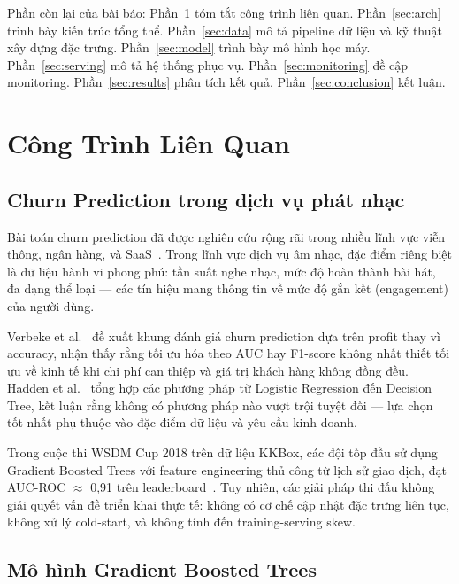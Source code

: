 \documentclass[conference]{IEEEtran}
\begin{document}
Phần còn lại của bài báo: Phần~\ref{sec:related} tóm tắt công trình liên quan.
Phần~\ref{sec:arch} trình bày kiến trúc tổng thể. Phần~\ref{sec:data} mô tả
pipeline dữ liệu và kỹ thuật xây dựng đặc trưng. Phần~\ref{sec:model} trình
bày mô hình học máy. Phần~\ref{sec:serving} mô tả hệ thống phục vụ.
Phần~\ref{sec:monitoring} đề cập monitoring. Phần~\ref{sec:results} phân tích
kết quả. Phần~\ref{sec:conclusion} kết luận.

\section{Công Trình Liên Quan}
\label{sec:related}

\subsection{Churn Prediction trong dịch vụ phát nhạc}

Bài toán churn prediction đã được nghiên cứu rộng rãi trong nhiều lĩnh vực
viễn thông, ngân hàng, và SaaS~\cite{verbeke2012new}. Trong lĩnh vực dịch vụ
âm nhạc, đặc điểm riêng biệt là dữ liệu hành vi phong phú: tần suất nghe
nhạc, mức độ hoàn thành bài hát, đa dạng thể loại — các tín hiệu mang thông
tin về mức độ gắn kết (engagement) của người dùng.

Verbeke et al.~\cite{verbeke2012new} đề xuất khung đánh giá churn prediction
dựa trên profit thay vì accuracy, nhận thấy rằng tối ưu hóa theo AUC hay
F1-score không nhất thiết tối ưu về kinh tế khi chi phí can thiệp và giá trị
khách hàng không đồng đều. Hadden et al.~\cite{hadden2007computer} tổng hợp
các phương pháp từ Logistic Regression đến Decision Tree, kết luận rằng không
có phương pháp nào vượt trội tuyệt đối — lựa chọn tốt nhất phụ thuộc vào
đặc điểm dữ liệu và yêu cầu kinh doanh.

Trong cuộc thi WSDM Cup 2018 trên dữ liệu KKBox, các đội tốp đầu sử dụng
Gradient Boosted Trees với feature engineering thủ công từ lịch sử giao dịch,
đạt AUC-ROC $\approx$ 0,91 trên leaderboard~\cite{wsdm2018}. Tuy nhiên, các
giải pháp thi đấu không giải quyết vấn đề triển khai thực tế: không có cơ
chế cập nhật đặc trưng liên tục, không xử lý cold-start, và không tính đến
training-serving skew.

\subsection{Mô hình Gradient Boosted Trees}
\end{document}
